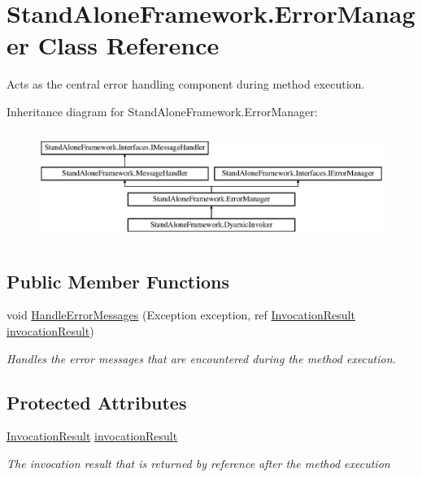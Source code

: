 \hypertarget{class_stand_alone_framework_1_1_error_manager}{\section{Stand\+Alone\+Framework.\+Error\+Manager Class Reference}
\label{class_stand_alone_framework_1_1_error_manager}
}


Acts as the central error handling component during method execution.  


Inheritance diagram for Stand\+Alone\+Framework.\+Error\+Manager\+:\begin{figure}[H]
\begin{center}
\leavevmode
\includegraphics[height=3.601286cm]{class_stand_alone_framework_1_1_error_manager}
\end{center}
\end{figure}
\subsection*{Public Member Functions}
\begin{DoxyCompactItemize}
\item 
void \hyperlink{class_stand_alone_framework_1_1_error_manager_a0f6fe7860c545b64f9adaeae7a7b5919}{Handle\+Error\+Messages} (Exception exception, ref \hyperlink{class_stand_alone_framework_1_1_framework_classes_1_1_invocation_result}{Invocation\+Result} \hyperlink{class_stand_alone_framework_1_1_error_manager_a25023f8540577f3d5d901f2569c3f2ec}{invocation\+Result})
\begin{DoxyCompactList}\small\item\em Handles the error messages that are encountered during the method execution. \end{DoxyCompactList}\end{DoxyCompactItemize}
\subsection*{Protected Attributes}
\begin{DoxyCompactItemize}
\item 
\hyperlink{class_stand_alone_framework_1_1_framework_classes_1_1_invocation_result}{Invocation\+Result} \hyperlink{class_stand_alone_framework_1_1_error_manager_a25023f8540577f3d5d901f2569c3f2ec}{invocation\+Result}
\begin{DoxyCompactList}\small\item\em The invocation result that is returned by reference after the method execution \end{DoxyCompactList}\end{DoxyCompactItemize}
